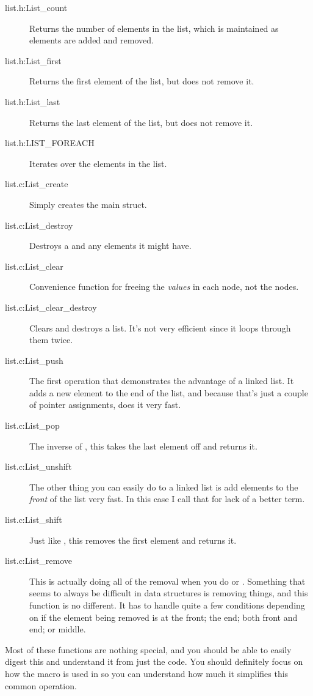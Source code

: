 \begin{description}
\item[list.h:List\_count] Returns the number of elements in the list, which is 
    maintained as elements are added and removed.
\item[list.h:List\_first] Returns the first element of the list, but does not
    remove it.
\item[list.h:List\_last] Returns the last element of the list, but does not
    remove it.
\item[list.h:LIST\_FOREACH] Iterates over the elements in the list.
\item[list.c:List\_create] Simply creates the main  struct.
\item[list.c:List\_destroy] Destroys a  and any elements it might have.
\item[list.c:List\_clear] Convenience function for freeing the \emph{values} in each
    node, not the nodes.
\item[list.c:List\_clear\_destroy] Clears and destroys a list.  It's not very efficient since it loops through them twice.
\item[list.c:List\_push] The first operation that demonstrates the advantage of a
    linked list.  It adds a new element to the end of the list, and because that's
    just a couple of pointer assignments, does it very fast.
\item[list.c:List\_pop] The inverse of , this takes the last
    element off and returns it.
\item[list.c:List\_unshift] The other thing you can easily do to a linked list is
    add elements to the \emph{front} of the list very fast.  In this case I call
    that  for lack of a better term.
\item[list.c:List\_shift] Just like , this removes the first
    element and returns it.
\item[list.c:List\_remove] This is actually doing all of the removal when you do
     or . 
    Something that seems to always be difficult in 
    data structures is removing things, and this function is no different. It
    has to handle quite a few conditions depending on if the element
    being removed is at the front; the end; both front and end; or middle.
\end{description}

Most of these functions are nothing special, and you should be able to easily
digest this and understand it from just the code.  You should definitely focus
on how the  macro is used in  so you
can understand how much it simplifies this common operation.


